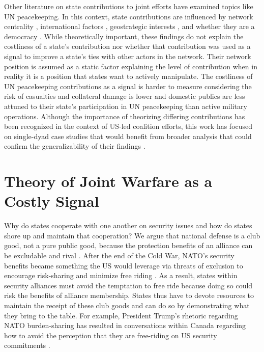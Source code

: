 \documentclass[12pt,letterpaper]{article}
\begin{document}
	Other literature on state contributions to joint efforts have examined topics like UN peacekeeping. In this context, state contributions are influenced by network centrality \citep{dorussen_networkedinternationalpolitics_2016}, international factors \citep{mullenbach_decidingkeeppeace_2005}, geostrategic interests \citep{baltrusaitis_friendsindeedcoalition_2008}, and whether they are a democracy \citep{lebovic_unitingpeacedemocracies_2004}. While theoretically important, these findings do not explain the costliness of a state's contribution nor whether that contribution was used as a signal to improve a state's ties with other actors in the network. Their network position is assumed as a static factor explaining the level of contribution when in reality it is a position that states want to actively manipulate. The costliness of UN peacekeeping contributions as a signal is harder to measure considering the risk of casualties and collateral damage is lower and domestic publics are less attuned to their state's participation in UN peacekeeping than active military operations. Although the importance of theorizing differing contributions has been recognized in the context of US-led coalition efforts, this work has focused on single-dyad case studies that would benefit from broader analysis that could confirm the generalizability of their findings \citep[4-5]{mello_politicsmultinationalmilitary_2018}.

\section{Theory of Joint Warfare as a Costly Signal}
	Why do states cooperate with one another on security issues and how do states shore up and maintain that cooperation? We argue that national defense is a club good, not a pure public good, because the protection benefits of an alliance can be excludable and rival \citep[336]{sandler_clubtheorythirty_1997}. After the end of the Cold War, NATO's security benefits became something the US would leverage via threats of exclusion to encourage risk-sharing and minimize free riding \citep[324-325]{ringsmose_natoburdensharingredux_2010}. As a result, states within security alliances must avoid the temptation to free ride because doing so could risk the benefits of alliance membership. States thus have to devote resources to maintain the receipt of these club goods and can do so by demonstrating what they bring to the table. For example, President Trump's rhetoric regarding NATO burden-sharing has resulted in conversations within Canada regarding how to avoid the perception that they are free-riding on US security commitments \citep[143]{mckay_whycanadabest_2018}.
	
\end{document}
